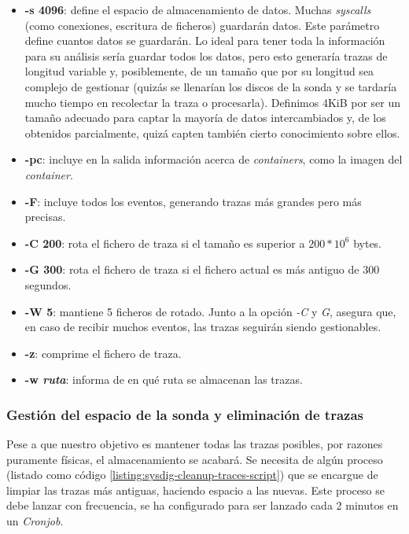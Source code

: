 \begin{itemize}
    \item \textbf{-s 4096}: define el espacio de almacenamiento de datos. Muchas \emph{syscalls} (como conexiones, escritura de ficheros) guardarán datos. Este parámetro define 
    cuantos datos se guardarán. Lo ideal para tener toda la información para su análisis sería guardar todos los datos, pero esto generaría trazas de longitud variable 
    y, posiblemente, de un tamaño que por su longitud sea complejo de gestionar (quizás se llenarían los discos de la sonda y se tardaría mucho tiempo en recolectar la traza o procesarla). 
    Definimos 4KiB por ser un tamaño adecuado para captar la mayoría de datos intercambiados y, de los obtenidos parcialmente, quizá capten también cierto conocimiento sobre ellos. 
    \item \textbf{-pc}: incluye en la salida información acerca de \emph{containers}, como la imagen del \emph{container}.
    \item \textbf{-F}: incluye todos los eventos, generando trazas más grandes pero más precisas.
    \item \textbf{-C 200}: rota el fichero de traza si el tamaño es superior a $200 * 10^6$ bytes.
    \item \textbf{-G 300}: rota el fichero de traza si el fichero actual es más antiguo de 300 segundos.
    \item \textbf{-W 5}: mantiene 5 ficheros de rotado. Junto a la opción \emph{-C} y \emph{G}, asegura que, en caso
    de recibir muchos eventos, las trazas seguirán siendo gestionables.
    \item \textbf{-z}: comprime el fichero de traza.
    \item \textbf{-w \emph{ruta}}: informa de en qué ruta se almacenan las trazas.
\end{itemize}

   

\subsubsection{Gestión del espacio de la sonda y eliminación de trazas}

Pese a que nuestro objetivo es mantener todas las trazas posibles, por razones puramente físicas,
el almacenamiento se acabará. Se necesita de algún proceso (listado como código \ref{listing:sysdig-cleanup-traces-script}) que se encargue de limpiar las trazas más antiguas, haciendo espacio
a las nuevas. Este proceso se debe lanzar con frecuencia, se ha configurado para ser lanzado cada 2 minutos en un \emph{Cronjob}.

